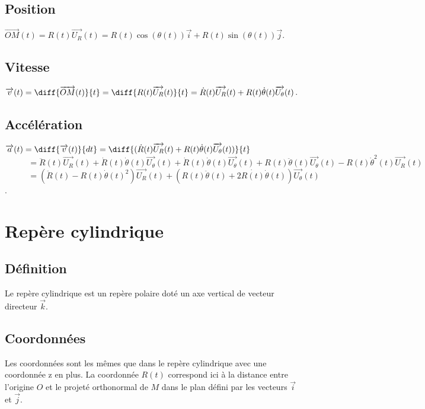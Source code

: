 \documentclass[a4paper,10pt]{book} %
\begin{document}
\subsection{Position}
$\overrightarrow{OM}(t)=R(t)\overrightarrow{U_R}(t)=R(t)\cos(\theta(t))\overrightarrow{i}+R(t)\sin(\theta(t))\overrightarrow{j}$.

\subsection{Vitesse}
$\overrightarrow{v}(t)=\diff{\overrightarrow{OM}(t)}{t}=\diff{R(t)\overrightarrow{U_R}(t)}{t}=\dot{R}(t)\overrightarrow{U_R}(t)+R(t)\dot{\theta}(t)\overrightarrow{U_\theta}(t)$.

\subsection{Accélération}
$\overrightarrow{a}(t)=\diff{\overrightarrow{v}(t)}{dt}=\diff{(\dot{R}(t)\overrightarrow{U_R}(t)+R(t)\dot{\theta}(t)\overrightarrow{U_\theta}(t))}{t}$\\

$\phantom{\overrightarrow{a}(t)}=\ddot{R}(t)\overrightarrow{U_R}(t)+\dot{R}(t)\dot{\theta}(t)\overrightarrow{U_\theta}(t)+\dot{R}(t)\dot{\theta}(t)\overrightarrow{U_\theta}(t)+R(t)\ddot{\theta}(t)\overrightarrow{U_\theta}(t)-R(t)\dot{\theta}^2(t)\overrightarrow{U_R}(t)$\\

$\phantom{\overrightarrow{a}(t)}=(\ddot{R}(t)-R(t)\dot{\theta}(t)^2)\overrightarrow{U_R}(t)+(R(t)\ddot{\theta}(t)+2\dot{R(t)}\dot{\theta}(t))\overrightarrow{U_\theta}(t)$.

\newpage

\section{Repère cylindrique}
\subsection{Définition}
Le repère cylindrique est un repère polaire doté un axe vertical de vecteur directeur $\overrightarrow{k}$.

\subsection{Coordonnées}
Les coordonnées sont les mêmes que dans le repère cylindrique avec une coordonnée z en plus.
La coordonnée $R(t)$ correspond ici à la distance entre l'origine $O$ et le projeté orthonormal de $M$ dans le plan défini par les vecteurs $\overrightarrow{i}$ et $\overrightarrow{j}$.
\end{document}
